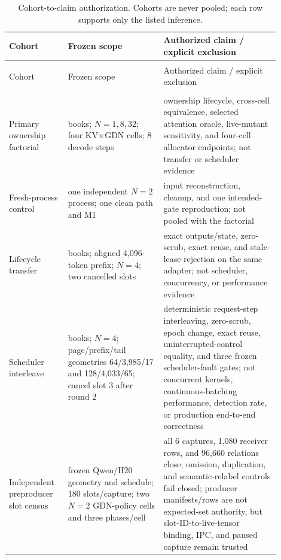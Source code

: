 \documentclass{article}
\begin{document}
\begingroup
\footnotesize
\setlength{\LTpre}{0pt}
\setlength{\LTpost}{0pt}
\begin{longtable}{@{}>{\raggedright\arraybackslash}p{0.19\linewidth}>{\raggedright\arraybackslash}p{0.32\linewidth}>{\raggedright\arraybackslash}p{0.39\linewidth}@{}}
  \caption{Cohort-to-claim authorization.  Cohorts are never pooled; each row
  supports only the listed inference.}
  \label{tab:cohorts}\\
  \toprule
  Cohort & Frozen scope & Authorized claim / explicit exclusion \\
  \midrule
  \endfirsthead
  \multicolumn{3}{c}{\textit{Table~\ref{tab:cohorts} continued.}}\\
  \toprule
  Cohort & Frozen scope & Authorized claim / explicit exclusion \\
  \midrule
  \endhead
  \midrule
  \multicolumn{3}{r}{\textit{Continued on next page}}\\
  \endfoot
  \bottomrule
  \endlastfoot
  Primary ownership factorial & 8 books; $N=1,8,32$; four KV$\times$GDN cells; 8 decode steps & ownership lifecycle, cross-cell equivalence, selected attention oracle, live-mutant sensitivity, and four-cell allocator endpoints; not transfer or scheduler evidence \\
  Fresh-process control & one independent $N=2$ process; one clean path and M1 & input reconstruction, cleanup, and one intended-gate reproduction; not pooled with the factorial \\
  Lifecycle transfer & 8 books; aligned 4,096-token prefix; $N=4$; two cancelled slots & exact outputs/state, zero-scrub, exact reuse, and stale-lease rejection on the same adapter; not scheduler, concurrency, or performance evidence \\
  Scheduler interleave & 8 books; $N=4$; page/prefix/tail geometries 64/3,985/17 and 128/4,033/65; cancel slot 3 after round 2 & deterministic request-step interleaving, zero-scrub, epoch change, exact reuse, uninterrupted-control equality, and three frozen scheduler-fault gates; not concurrent kernels, continuous-batching performance, detection rate, or production end-to-end correctness \\
  Independent preproducer slot census & frozen Qwen/H20 geometry and schedule; 180 slots/capture; two $N=2$ GDN-policy cells and three phases/cell & all 6 captures, 1,080 receiver rows, and 96,660 relations close; omission, duplication, and semantic-relabel controls fail closed; producer manifests/rows are not expected-set authority, but slot-ID-to-live-tensor binding, IPC, and paused capture remain trusted \\

\end{longtable}
\end{document}
